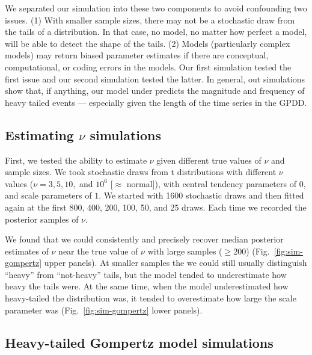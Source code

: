 We separated our simulation into these two components to avoid confounding two issues. (1) With smaller sample sizes, there may not be a stochastic draw from the tails of a distribution. In that case, no model, no matter how perfect a model, will be able to detect the shape of the tails. (2) Models (particularly complex models) may return biased parameter estimates if there are conceptual, computational, or coding errors in the models. Our first simulation tested the first issue and our second simulation tested the latter. In general, out simulations show that, if anything, our model under predicts the magnitude and frequency of heavy tailed events --- especially given the length of the time series in the GPDD.

\subsection{Estimating $\nu$ simulations}

First, we tested the ability to estimate $\nu$ given different true values of $\nu$ and sample sizes. We took stochastic draws from t distributions with different $\nu$ values ($\nu = 3, 5, 10,$ and $10^6$ [$\approx$ normal]), with central tendency parameters of $0$, and scale parameters of $1$. We started with 1600 stochastic draws and then fitted again at the first 800, 400, 200, 100, 50, and 25 draws. Each time we recorded the posterior samples of $\nu$.

We found that we could consistently and precisely recover median posterior estimates of $\nu$ near the true value of $\nu$ with large samples ($\ge 200$) (Fig.~\ref{fig:sim-gompertz} upper panels). At smaller samples the we could still usually distinguish ``heavy'' from ``not-heavy'' tails, but the model tended to underestimate how heavy the tails were. At the same time, when the model underestimated how heavy-tailed the distribution was, it tended to overestimate how large the scale parameter was (Fig.~\ref{fig:sim-gompertz} lower panels).



\subsection{Heavy-tailed Gompertz model simulations}


